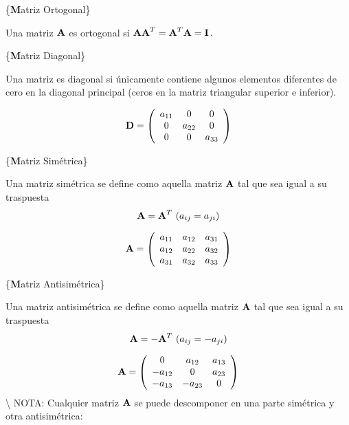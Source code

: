 \documentclass[
]{agujournal2019}
\begin{document}
\vspace{0.5cm}

\{\noindent \textbf Matriz Ortogonal\}

Una matriz \({\textbf A}\) es ortogonal si
\({\textbf A}{\textbf A}^T={\textbf A}^T{\textbf A}={\textbf I}\,.\)

\vspace{0.5cm}

\{\noindent \textbf Matriz Diagonal\}

Una matriz es diagonal si únicamente contiene algunos elementos
diferentes de cero en la diagonal principal (ceros en la matriz
triangular superior e inferior).

\[{\textbf D}=\left(\begin{array}{ccc}
  a_{11} & 0 & 0\\
  0 & a_{22} & 0\\
  0 & 0 & a_{33}
\end{array}\right)
\]

\vspace{0.5cm}

\{\noindent \textbf Matriz Simétrica\}

Una matriz simétrica se define como aquella matriz \({\textbf A}\) tal
que sea igual a su traspuesta
\[{\textbf A}={\textbf A}^T\,\,(a_{ij}=a_{ji})\]

\[{\textbf A}=\left(\begin{array}{cccc}
  a_{11} & a_{12} & a_{31}\\
  a_{12} & a_{22} & a_{32}\\
  a_{31} & a_{32} & a_{33}\\
\end{array}\right)
\]

\vspace{0.5cm}

\{\noindent \textbf Matriz Antisimétrica\}

Una matriz antisimétrica se define como aquella matriz \({\textbf A}\)
tal que sea igual a su traspuesta
\[{\textbf A}=-{\textbf A}^T\,\,(a_{ij}=-a_{ji})\]

\[{\textbf A}=\left(\begin{array}{cccc}
  0 & a_{12} & a_{13}\\
  -a_{12} & 0 & a_{23}\\
  -a_{13} & -a_{23} & 0\\
\end{array}\right)
\] \textbackslash{} NOTA: Cualquier matriz \({\textbf A}\) se puede
descomponer en una parte simétrica y otra antisimétrica:
\end{document}
